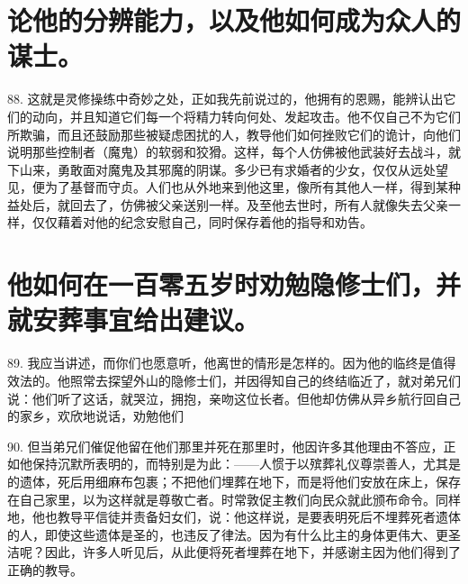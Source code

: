 
\section{论他的分辨能力，以及他如何成为众人的谋士。}

88. 这就是灵修操练中奇妙之处，正如我先前说过的，他拥有的恩赐，能辨认出它们的动向，并且知道它们每一个将精力转向何处、发起攻击。他不仅自己不为它们所欺骗，而且还鼓励那些被疑虑困扰的人，教导他们如何挫败它们的诡计，向他们说明那些控制者（魔鬼）的软弱和狡猾。这样，每个人仿佛被他武装好去战斗，就下山来，勇敢面对魔鬼及其邪魔的阴谋。多少已有求婚者的少女，仅仅从远处望见，便为了基督而守贞。人们也从外地来到他这里，像所有其他人一样，得到某种益处后，就回去了，仿佛被父亲送别一样。及至他去世时，所有人就像失去父亲一样，仅仅藉着对他的纪念安慰自己，同时保存着他的指导和劝告。\par


\section{他如何在一百零五岁时劝勉隐修士们，并就安葬事宜给出建议。}

89. 我应当讲述，而你们也愿意听，他离世的情形是怎样的。因为他的临终是值得效法的。他照常去探望外山的隐修士们，并因得知自己的终结临近了，就对弟兄们说：他们听了这话，就哭泣，拥抱，亲吻这位长者。但他却仿佛从异乡航行回自己的家乡，欢欣地说话，劝勉他们\par

90. 但当弟兄们催促他留在他们那里并死在那里时，他因许多其他理由不答应，正如他保持沉默所表明的，而特别是为此：——人惯于以殡葬礼仪尊崇善人，尤其是的遗体，死后用细麻布包裹；不把他们埋葬在地下，而是将他们安放在床上，保存在自己家里，以为这样就是尊敬亡者。时常敦促主教们向民众就此颁布命令。同样地，他也教导平信徒并责备妇女们，说：他这样说，是要表明死后不埋葬死者遗体的人，即使这些遗体是圣的，也违反了律法。因为有什么比主的身体更伟大、更圣洁呢？因此，许多人听见后，从此便将死者埋葬在地下，并感谢主因为他们得到了正确的教导。\par

